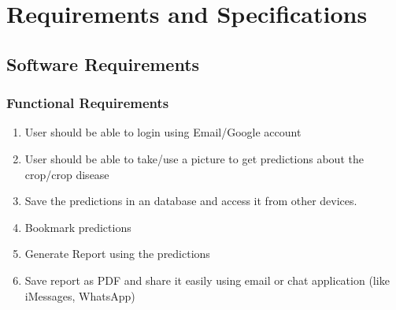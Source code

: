 \documentclass[../Report.tex]{subfiles}
\begin{document}
\chapter{Requirements and  Specifications}

\section{Software Requirements}

\subsection{Functional Requirements}

\begin{enumerate}
  \item User should be able to login using Email/Google account
  
  \item User should be able to take/use a picture to get predictions about the crop/crop disease
  
  \item Save the predictions in an database and access it from other devices.
  
  \item Bookmark predictions
  
  \item Generate Report using the predictions
  
  \item Save report as PDF and share it easily using email or chat application (like iMessages, WhatsApp)

\end{enumerate}
\end{document}
